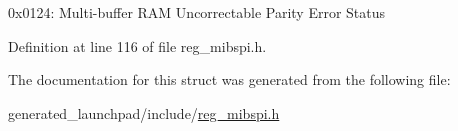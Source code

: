 0x0124\+: Multi-\/buffer R\+AM Uncorrectable Parity Error Status 

Definition at line 116 of file reg\+\_\+mibspi.\+h.



The documentation for this struct was generated from the following file\+:\begin{DoxyCompactItemize}
\item 
generated\+\_\+launchpad/include/\mbox{\hyperlink{reg__mibspi_8h}{reg\+\_\+mibspi.\+h}}\end{DoxyCompactItemize}
